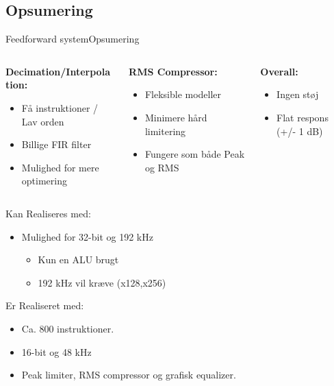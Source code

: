 \documentclass[10pt,aspectratio=169]{beamer}
\begin{document}
\subsection{Opsumering}
\begin{frame}{Feedforward system}{Opsumering}

\begin{columns}[t]
\begin{column}{0.40\textwidth}
\textbf{Decimation/Interpolation:}
\begin{itemize}
\item Få instruktioner / Lav orden
\item Billige FIR filter
\item Mulighed for mere optimering
\end{itemize}
  \end{column}
  \begin{column}{0.3\textwidth}
\textbf{RMS Compressor:}
\begin{itemize}
\item Fleksible modeller
\item Minimere hård limitering
\item Fungere som både Peak og RMS
\end{itemize}
  \end{column}
    \begin{column}{0.3\textwidth}
\textbf{Overall:}
\begin{itemize}
\item Ingen støj
\item Flat respons (+/- 1 dB)
\end{itemize}
  \end{column}
\end{columns}

\begin{block}{Kan Realiseres med:}
\begin{itemize}
\item Mulighed for 32-bit og 192 kHz
\begin{itemize}
\item Kun en ALU brugt
\item 192 kHz vil kræve (x128,x256)
\end{itemize}
\end{itemize}
\end{block}
\vspace{-3mm}
\begin{block}{Er Realiseret med:}
\begin{itemize}
\item Ca. 800 instruktioner.
\item 16-bit og 48 kHz
\item Peak limiter, RMS compressor og grafisk equalizer.
\end{itemize}
\end{block}

\end{frame}
\end{document}
